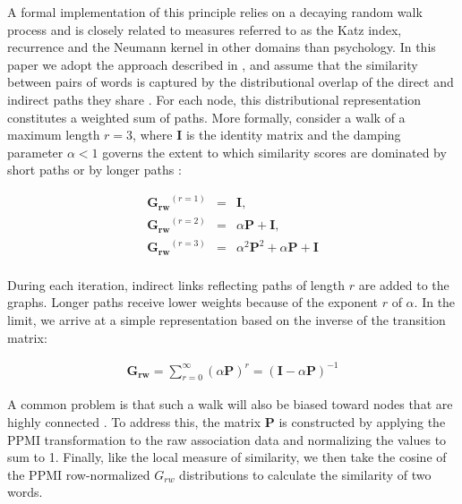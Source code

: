 \documentclass[a4paper,doc,natbib,floatsintext]{apa6}
\begin{document}
A formal implementation of this principle relies on a decaying random walk process \cite[see][]{AbbottAusterweil2015,BorgeHolthoeferArenas2010,DeDeyne2012Weak,Griffiths2007b} and is closely related to measures referred to as the Katz index, recurrence and the Neumann kernel \citep{Fouss2016} in other domains than psychology. In this paper we adopt the approach described in \citet{DeDeyne2016JEP}, and assume that the similarity between pairs of words is captured by the distributional overlap of the direct and indirect paths they share \citep{BorgeHolthoeferArenas2010,Deese1965,DeDeyne2014CorpusSize}.
For each node, this distributional representation constitutes a weighted sum of paths. More formally, consider a walk of a maximum length $r = 3$, where $\mathbf{I}$ is the identity matrix and the damping parameter $\alpha < 1$ governs the extent to which similarity scores are dominated by short paths or by longer paths \citep{Newman2010}:

\begin{equation}
\begin{array}{lcl}
\mathbf{G_{rw}}^{(r=1)} & = & \mathbf{I},\\
\mathbf{G_{rw}}^{(r=2)} & = & \alpha \mathbf{P} + \mathbf{I},\\
\mathbf{G_{rw}}^{(r=3)} & = & \alpha^2\mathbf{P}^2 + \alpha\mathbf{P} + \mathbf{I}\\
\end{array}
 \label{equation_iteration}
\end{equation}

\noindent
During each iteration, indirect links reflecting paths of length $r$ are added to the graphs. Longer paths receive lower weights because of the exponent $r$ of $\alpha$. In the limit, we arrive at a simple representation based on the inverse of the transition matrix:

\begin{equation}
\begin{array}{lcl}
\mathbf{G_{rw}}  = \sum_{r =0}^{\infty}(\alpha\mathbf{P})^r  =   (\mathbf{I} - \alpha \mathbf{P})^{-1}
\end{array}
\label{equation_RW_algebraic}
\end{equation}
\noindent

A common problem is that such a walk will also be biased toward nodes that are highly connected \citep{Newman2010}. To address this, the matrix $\mathbf{P}$ is constructed by applying the PPMI transformation to the raw association data and normalizing the values to sum to 1. Finally, like the local measure of similarity, we then take the cosine of the PPMI row-normalized $G_{rw}$ distributions to calculate the similarity of two words.
\end{document}
